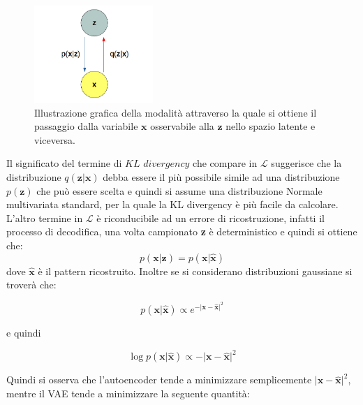 \newpage

\begin{figure}[h!]
	\centering		\includegraphics[width=0.40\textwidth]{figs/grafoVAE.png}
	\caption{Illustrazione grafica della modalità attraverso la quale si ottiene il passaggio dalla variabile $\textbf{x}$ osservabile alla $\textbf{z}$ nello spazio latente e viceversa.}
	\label{grafo}
\end{figure}

Il significato del termine di $\textit{KL divergency}$ che compare in $\mathcal{L}$ suggerisce che la distribuzione $q(\textbf{z}|\textbf{x})$ debba essere il più possibile simile ad una distribuzione $p(\textbf{z})$ che può essere scelta e quindi si assume una distribuzione Normale multivariata standard, per la quale la KL divergency è più facile da calcolare. \\
L'altro termine in $\mathcal{L}$ è riconducibile ad un errore di ricostruzione, infatti il processo di decodifica, una volta campionato \textbf{z} è deterministico e quindi si ottiene che:
\begin{equation}
	p(\textbf{x}|\textbf{z}) = p(\textbf{x}|\hat{\textbf{x}})
\end{equation}
dove $\hat{\textbf{x}}$ è il pattern ricostruito. Inoltre se si considerano distribuzioni gaussiane si troverà che:

\begin{equation}
	p(\textbf{x}|\hat{\textbf{x}}) \propto e^{{-{\lvert \textbf{x}-\hat{\textbf{x}}} \rvert}^2}
\end{equation}

e quindi

\begin{equation}
	\log p(\textbf{x}|\hat{\textbf{x}}) \propto -{\lvert \textbf{x}-\hat{\textbf{x}} \rvert}^2
\end{equation}

Quindi si osserva che l'autoencoder tende a minimizzare semplicemente ${\lvert \textbf{x}-\hat{\textbf{x}} \rvert}^2$, mentre il VAE tende a minimizzare la seguente quantità:

